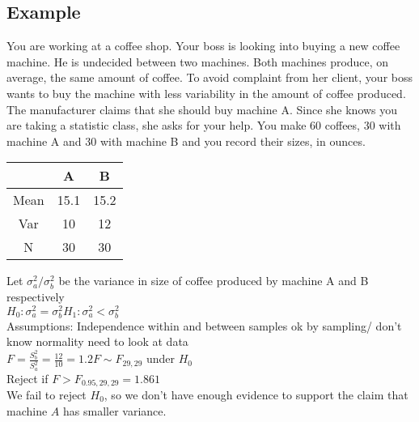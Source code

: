 \documentclass{article}
\begin{document}
\subsection{Example}
You are working at a coffee shop. Your boss is looking into buying a new
coffee machine. He is undecided between two machines. Both machines
produce, on average, the same amount of coffee. To avoid complaint from
her client, your boss wants to buy the machine with less variability in the
amount of coffee produced. The manufacturer claims that she should buy
machine A. Since she knows you are taking a statistic class, she asks for
your help. You make 60 coffees, 30 with machine A and 30 with machine B
and you record their sizes, in ounces.
\begin{center}
    \begin{tabular}{c|c|c}
         & A & B \\
         \hline
         Mean & 15.1 & 15.2\\
         \hline
         Var & 10 & 12\\
         \hline
         N & 30 & 30
    \end{tabular}
\end{center}
Let $\sigma_a^2/\sigma_b^2$ be the variance in size of coffee produced by machine A and B respectively\\
$H_0:\sigma_a^2=\sigma_b^2$\hspace*{0.5in}$H_1:\sigma_a^2<\sigma_b^2$\\
Assumptions: Independence within and between samples ok by sampling/ don't know normality need to look at data\\
$F=\frac{S_b^2}{S_a^2}=\frac{12}{10}=1.2$\hspace*{0.5in}$F\sim F_{29,29}$ under $H_0$\\
Reject if $F>F_{0.95,29,29}=1.861$\\
We fail to reject $H_0$, so we don't have enough evidence to support the claim that machine $A$ has smaller variance.
\end{document}
